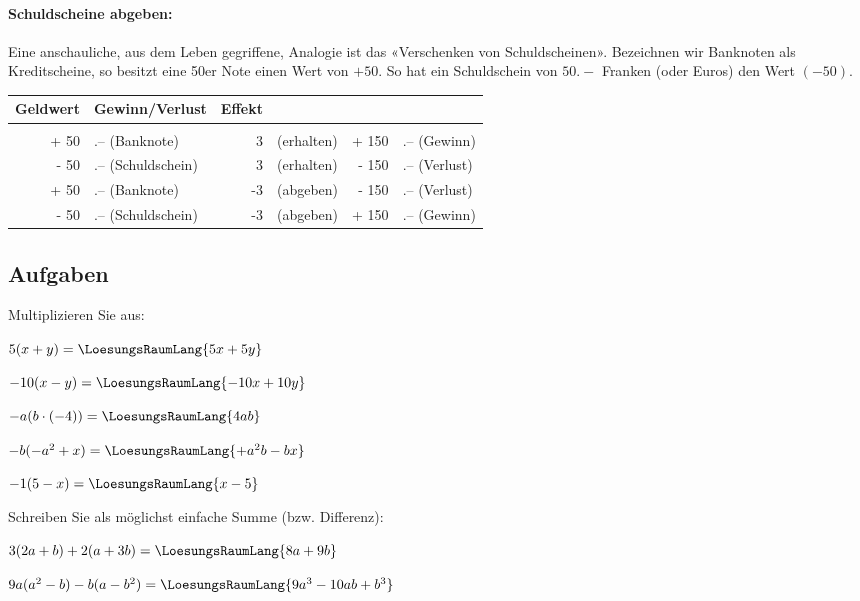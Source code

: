 \paragraph{Schuldscheine abgeben:}
Eine anschauliche, aus dem Leben gegriffene, Analogie ist das «Verschenken von Schuldscheinen». Bezeichnen wir Banknoten als Kreditscheine, so besitzt eine 50er Note einen Wert von $+50$. So hat ein Schuldschein von $50.-$ Franken (oder Euros) den Wert $(-50)$.

\begin{tabular}{r@{}l|rl|r@{}l}
Geldwert & Gewinn/Verlust & Effekt\\
\hline\\
 + 50&.--   (Banknote)     &  3&  (erhalten)  & + 150&.-- (Gewinn)   \\
 - 50&.--   (Schuldschein) &  3&  (erhalten)  & - 150&.-- (Verlust)  \\
 + 50&.--   (Banknote)     & -3&  (abgeben)   & - 150&.-- (Verlust)  \\
 - 50&.--   (Schuldschein) & -3&  (abgeben)   & + 150&.-- (Gewinn)   \\
\end{tabular}


\newpage
\subsection*{Aufgaben}

Multiplizieren Sie aus:

\begin{bbwAufgabenBlock}
\item $5(x+y)=\LoesungsRaumLang{5x+5y}$
\item $-10(x-y)=\LoesungsRaumLang{-10x+10y}$
\item $-a(b\cdot{}(-4)) = \LoesungsRaumLang{4ab}$
\item $-b(-a^2+x) = \LoesungsRaumLang{+a^2b - bx}$
\item $-1(5-x)=\LoesungsRaumLang{x-5}$
\end{bbwAufgabenBlock}


Schreiben Sie als möglichst einfache Summe (bzw. Differenz):
\begin{bbwAufgabenBlock}
\item $3(2a+b) + 2(a+3b)=\LoesungsRaumLang{8a+9b}$
\item $9a(a^2-b)-b(a-b^2) = \LoesungsRaumLang{9a^3 - 10ab + b^3}$
\end{bbwAufgabenBlock}

